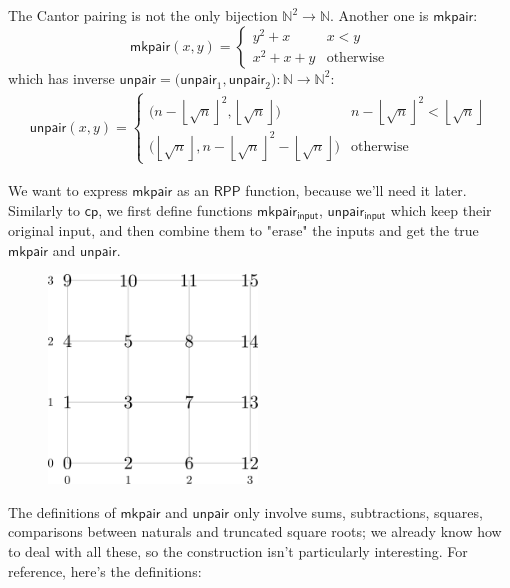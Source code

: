 \documentclass{book}
\theoremstyle{definition}
\theoremstyle{remark}
\theoremstyle{plain}
\newcommand{\NN}{\mathbb{N}}
\newcommand{\floor}[1]{\left\lfloor #1 \right\rfloor}
\newcommand{\RPP}{\mathsf{RPP}}
\newcommand{\rppcp}{\mathsf{cp}}
\newcommand{\rppmkpair}{\mathsf{mkpair}}
\newcommand{\rppmkpairi}{\mathsf{mkpair_{input}}}
\newcommand{\rppunpair}{\mathsf{unpair}}
\newcommand{\rppunpairi}{\mathsf{unpair_{input}}}
\begin{document}
The Cantor pairing is not the only bijection $\NN^2 \to \NN$.
Another one is $\rppmkpair$:
\[\rppmkpair(x,y) = \begin{cases} y^2 + x & x < y \\ x^2 + x + y & \text{otherwise} \end{cases} \]
which has inverse $\rppunpair = \big( \rppunpair_1, \rppunpair_2 \big) : \NN \to \NN^2$:
\begin{align*}
  \rppunpair(x,y) = \begin{cases} \big( n - \floor{\sqrt{n}}^2, \floor{\sqrt{n}} \big)                    & n - \floor{\sqrt{n}}^2 < \floor{\sqrt{n}} \\
                                  \big( \floor{\sqrt{n}}, n - \floor{\sqrt{n}}^2 - \floor{\sqrt{n}} \big) & \text{otherwise} \end{cases}
\end{align*}

We want to express $\rppmkpair$ as an $\RPP$ function, because we'll need it later.
Similarly to $\rppcp$, we first define functions $\rppmkpairi$, $\rppunpairi$ which keep their original input,
and then combine them to "erase" the inputs and get the true $\rppmkpair$ and $\rppunpair$.

\begin{figure}[H]
  \centering
  \includegraphics[width=15em]{Immagini/mkpair.png}
\end{figure}

The definitions of $\rppmkpair$ and $\rppunpair$ only involve sums, subtractions, squares, comparisons between naturals and truncated square roots;
we already know how to deal with all these, so the construction isn't particularly interesting.
For reference, here's the definitions:
\end{document}
